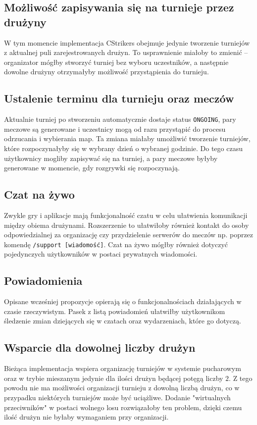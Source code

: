 \documentclass[shortabstract]{iithesis}
\theoremstyle{definition} \newtheorem{definition}{Definicja}[]
\theoremstyle{remark} \newtheorem{remark}[definition]{Observation}
\theoremstyle{plain} \newtheorem{theorem}[definition]{Theorem}
\theoremstyle{plain} \newtheorem{lemma}[definition]{Lemma}
\begin{document}
\subsection{Możliwość zapisywania się na turnieje przez drużyny}
W tym momencie implementacja CStrikers obejmuje jedynie tworzenie turniejów z aktualnej puli zarejestrowanych drużyn. To usprawnienie miałoby to zmienić -- organizator mógłby stworzyć turniej bez wyboru uczestników, a następnie dowolne drużyny otrzymałyby możliwość przystąpienia do turnieju.

\subsection{Ustalenie terminu dla turnieju oraz meczów}
Aktualnie turniej po stworzeniu automatycznie dostaje status \texttt{ONGOING}, pary meczowe są generowane i uczestnicy mogą od razu przystąpić do procesu odrzucania i wybierania map. Ta zmiana miałaby umożliwić tworzenie turniejów, które rozpoczynałyby się w wybrany dzień o wybranej godzinie. Do tego czasu użytkownicy mogliby zapisywać się na turniej, a pary meczowe byłyby generowane w momencie, gdy rozgrywki się rozpoczynają.

\subsection{Czat na żywo}
Zwykle gry i aplikacje mają funkcjonalność czatu w celu ułatwienia komunikacji między obiema drużynami. Rozszerzenie to ułatwiłoby również kontakt do osoby odpowiedzialnej za organizację czy przydzielenie serwerów do meczów np. poprzez komendę \texttt{/support [wiadomość]}. Czat na żywo mógłby również dotyczyć pojedynczych użytkowników w postaci prywatnych wiadomości.

\subsection{Powiadomienia}
Opisane wcześniej propozycje opierają się o funkcjonalnościach działających w czasie rzeczywistym. Pasek z listą powiadomień ułatwiłby użytkownikom śledzenie zmian dziejących się w czatach oraz wydarzeniach, które go dotyczą.

\subsection{Wsparcie dla dowolnej liczby drużyn}
Bieżąca implementacja wspiera organizację turniejów w systemie pucharowym oraz w trybie mieszanym jedynie dla ilości drużyn będącej potęgą liczby $2$. Z tego powodu nie ma możliwości organizacji turnieju z dowolną liczbą drużyn, co w przypadku niektórych turniejów może być uciążliwe. Dodanie "wirtualnych przeciwników" w postaci wolnego losu rozwiązałoby ten problem, dzięki czemu ilość drużyn nie byłaby wymaganiem przy organizacji.
\end{document}
